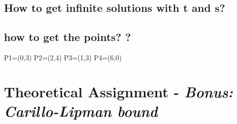 \documentclass[%
   10pt,              %
   nenglish,           %
   a4paper,           %
   DIV11,             %
]{scrartcl}%
\begin{document}
\subsection*{How to get infinite solutions with t and s?}

\subsection*{how to get the points? ?}

P1=(0,3)
P2=(2,4)
P3=(1,3)
P4=(6,0)

\section*{Theoretical Assignment - \textsl{Bonus: Carillo-Lipman bound}}

%
%
 
\end{document}
